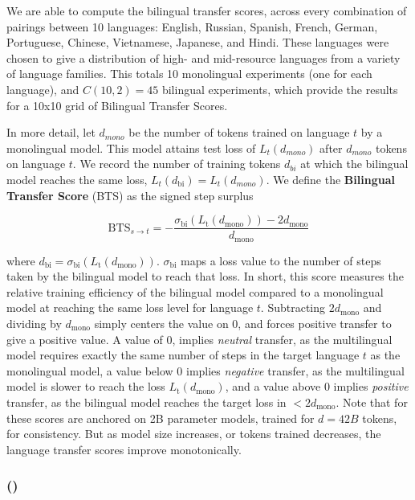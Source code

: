 We are able to compute the bilingual transfer scores, across every combination of pairings between 10 languages: English, Russian, Spanish, French, German, Portuguese, Chinese, Vietnamese, Japanese, and Hindi.
These languages were chosen to give a distribution of high- and mid-resource languages from a variety of language families.
This totals 10 monolingual experiments (one for each language), and $C(10,2)=45$ bilingual experiments, which provide the results for a 10x10 grid of Bilingual Transfer Scores. 

In more detail, let $d_{mono}$ be the number of tokens trained on language $t$ by a monolingual model. This model attains test loss of $L_{t}(d_{mono})$ after $d_{mono}$ tokens on language $t$.  
We record the number of training tokens $d_{bi}$ at which the bilingual model reaches the same loss, $L_{t}(d_{\text{bi}}) = L_{t}(d_{mono})$.
We define the \textbf{Bilingual Transfer Score} (BTS) as the signed step surplus

\[
\mathrm{BTS}_{s\!\rightarrow t}  = - \frac{\sigma_{\text{bi}}(L_{\text{t}}(d_{\mathrm{mono}})) - 2d_{\mathrm{mono}}}{d_{\mathrm{mono}}}
\]

where $d_{\text{bi}}=\sigma_{\text{bi}}(L_{\text{t}}(d_{\mathrm{mono}}))$. $\sigma_{\text{bi}}$ maps a loss value to the number of steps taken by the bilingual model to reach that loss.
In short, this score measures the relative training efficiency of the bilingual model compared to a monolingual model at reaching the same loss level for language $t$. 
Subtracting $2d_{\mathrm{mono}}$ and dividing by $d_{\mathrm{mono}}$ simply centers the value on 0, and forces positive transfer to give a positive value.
A value of 0, implies \emph{neutral} transfer, as the multilingual model requires exactly the same number of steps in the target language $t$ as the monolingual model, a value below 0 implies \emph{negative} transfer, as the multilingual model is slower to reach the loss $L_{\text{t}}(d_{\mathrm{mono}})$, and a value above 0 implies \emph{positive} transfer, as the bilingual model reaches the target loss in $<2d_{\mathrm{mono}}$.
Note that for  these scores are anchored on 2B parameter models, trained for $d\!=\!42B$ tokens, for consistency.
But as model size increases, or tokens trained decreases, the language transfer scores improve monotonically.

\subsubsection{\fas{} (\fasabb)}

